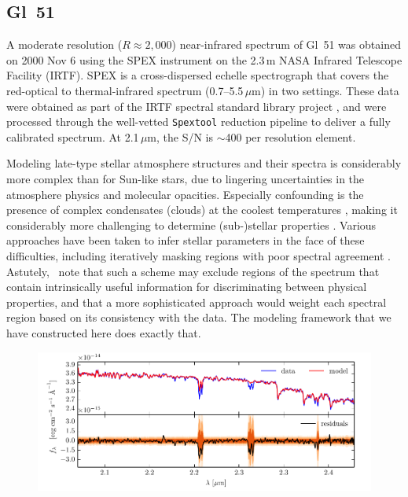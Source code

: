 \documentclass[iop,floatfix]{emulateapj}
\begin{document}
\subsection{Gl~51}

A moderate resolution ($R\approx2,000$) near-infrared spectrum of Gl~51 was obtained on 2000 
Nov 6 using the SPEX instrument \citep{rayner03} on the 2.3\,m NASA Infrared Telescope Facility 
(IRTF).  SPEX is a cross-dispersed echelle spectrograph that covers the red-optical to 
thermal-infrared spectrum (0.7--5.5\,$\mu$m) in two settings.  These data were obtained as part of 
the IRTF spectral standard library project \citep{cushing05,rayner09}, and were processed through 
the well-vetted {\tt Spextool} reduction pipeline \citep{cushing04,vacca03} to deliver a fully 
calibrated spectrum.  At 2.1\,$\mu$m, the S/N is $\sim$400 per resolution element.

Modeling late-type stellar atmosphere structures and their spectra is considerably more complex 
than for Sun-like stars, due to lingering uncertainties in the atmosphere physics and molecular 
opacities.  Especially confounding is the presence of complex condensates (clouds) at the coolest 
temperatures \citep{allard13}, making it considerably more challenging to determine (sub-)stellar 
properties \citep{rajpurohit14}.  Various approaches have been taken to infer stellar parameters in 
the face of these difficulties, including iteratively masking regions with poor spectral agreement 
\citep[e.g.,][]{mann13}.  Astutely, \citeauthor{mann13}~note that such a scheme may exclude 
regions of the spectrum that contain intrinsically useful information for discriminating between 
physical properties, and that a more sophisticated approach would weight each spectral region based 
on its consistency with the data.  The modeling framework that we have constructed here does 
exactly that.

\begin{figure}[!htb]
  \includegraphics{figs/residuals_Gl51_logg.pdf}
\end{figure}
\end{document}

